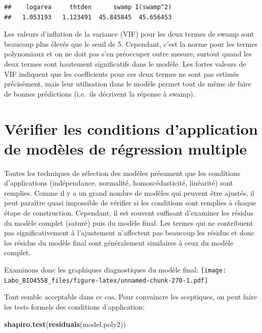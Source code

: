 \documentclass[
  12pt,
]{book}
\newenvironment{Shaded}{\begin{snugshade}}{\end{snugshade}}
\newcommand{\KeywordTok}[1]{\textcolor[rgb]{0.13,0.29,0.53}{\textbf{#1}}}
\newcommand{\NormalTok}[1]{#1}
\begin{document}
\begin{verbatim}
##    logarea     thtden      swamp I(swamp^2) 
##   1.053193   1.123491  45.845845  45.656453
\end{verbatim}

Les valeurs d'inflation de la variance (VIF) pour les deux termes de swamp sont beaucoup plus élevés que le seuil de 5. Cependant, c'est la norme pour les termes polynomiaux et on ne doit pas s'en préoccuper outre mesure, surtout quand les deux termes sont hautement significatifs dans le modèle. Les fortes valeurs de VIF indiquent que les coefficients pour ces deux termes ne sont pas estimés précisément, mais leur utilisation dans le modèle permet tout de même de faire de bonnes prédictions (i.e.~ils décrivent la réponse à swamp).

\hypertarget{vuxe9rifier-les-conditions-dapplication-de-moduxe8les-de-ruxe9gression-multiple}{%
\section{Vérifier les conditions d'application de modèles de régression multiple}\label{vuxe9rifier-les-conditions-dapplication-de-moduxe8les-de-ruxe9gression-multiple}}

Toutes les techniques de sélection des modèles présument que les conditions d'applications (indépendance, normalité, homoscédasticité, linéarité) sont remplies. Comme il y a un grand nombre de modèles qui peuvent être ajustés, il peut paraître quasi impossible de vérifier si les conditions sont remplies à chaque étape de construction. Cependant, il est souvent suffisant d'examiner les résidus du modèle complet (saturé) puis du modèle final. Les termes qui ne contribuent pas significativement à l'ajustement n'affectent pas beaucoup les résidus et donc les résidus du modèle final sont généralement similaires à ceux du modèle complet.

Examinons donc les graphiques diagnostiques du modèle final:
\texttt{[image: Labo\_BIO4558\_files/figure-latex/unnamed-chunk-270-1.pdf]}

Tout semble acceptable dans ce cas. Pour convaincre les sceptiques, on peut faire les tests formels des conditions d'application:

\begin{Shaded}
\begin{Highlighting}[]
\KeywordTok{shapiro.test}\NormalTok{(}\KeywordTok{residuals}\NormalTok{(model.poly2))}
\end{Highlighting}
\end{Shaded}
\end{document}

